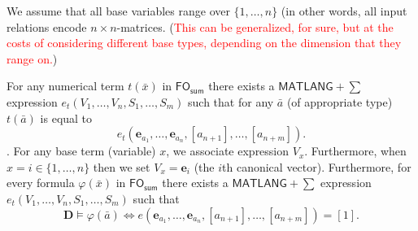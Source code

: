 We assume that all base variables range over $\{1,\ldots,n\}$ (in other words, all input relations encode $n\times n$-matrices. (\textcolor{red}{This can be generalized, for sure, but at the costs
of considering different base types, depending on the dimension that they range on.})

For any numerical term $t(\bar x)$ in $\textsf{FO}_{\textsf{sum}}$ there exists a $\textsf{MATLANG}+\sum$ expression $e_t(V_1,\ldots,V_n,S_1,\ldots,S_m)$ such that for
any $\bar a$ (of appropriate type) $t(\bar a)$ is equal to  
$$e_t(\mathbf{e}_{a_1},\ldots,\mathbf{e}_{a_n},[a_{n+1}],\ldots,[a_{n+m}]).$$. For any base term (variable) $x$, we associate expression $V_x$. Furthermore, when $x=i\in\{1,\ldots,n\}$
then we set $V_x=\mathbf{e}_i$ (the $i$th canonical vector).
Furthermore, for every formula $\varphi(\bar x)$  in $\textsf{FO}_{\textsf{sum}}$ there exists a  $\textsf{MATLANG}+\sum$ expression $e_t(V_1,\ldots,V_n,S_1,\ldots,S_m)$ such that
$$
\mathbf{D}\models\varphi(\bar a)  \Leftrightarrow e(\mathbf{e}_{a_1},\ldots,\mathbf{e}_{a_n},[a_{n+1}],\ldots,[a_{n+m}])=[1].
$$

